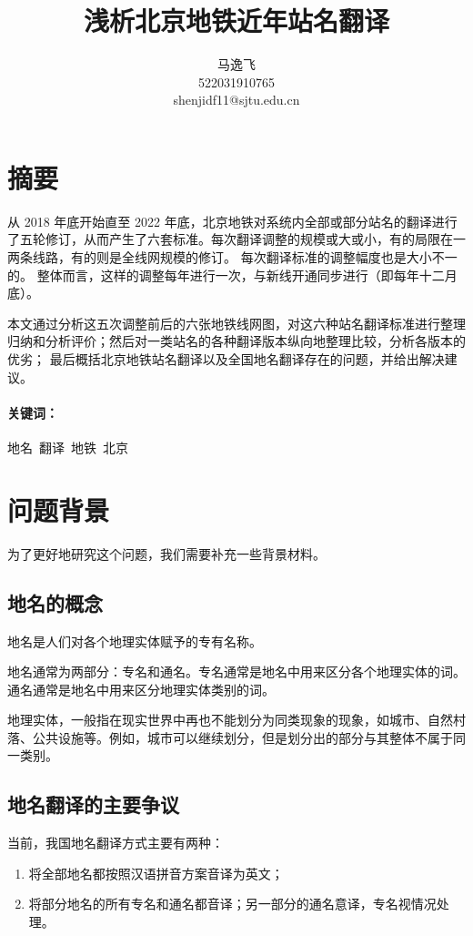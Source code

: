 \documentclass[a4paper,UTF8,12pt]{ctexart}
\title{浅析北京地铁近年站名翻译}
\author{马逸飞\\522031910765\\shenjidf11@sjtu.edu.cn}
\begin{document}
    \maketitle
    \tableofcontents

\section{摘要}
    从 2018 年底开始直至 2022 年底，北京地铁对系统内全部或部分站名的翻译进行了五轮修订，从而产生了六套标准。每次翻译调整的规模或大或小，有的局限在一两条线路，有的则是全线网规模的修订。
    每次翻译标准的调整幅度也是大小不一的。
    整体而言，这样的调整每年进行一次，与新线开通同步进行（即每年十二月底）。

    本文通过分析这五次调整前后的六张地铁线网图，对这六种站名翻译标准进行整理归纳和分析评价；然后对一类站名的各种翻译版本纵向地整理比较，分析各版本的优劣；
    最后概括北京地铁站名翻译以及全国地名翻译存在的问题，并给出解决建议。
    
    \paragraph{关键词：} 地名\ 翻译\ 地铁\ 北京

\section{问题背景}
    为了更好地研究这个问题，我们需要补充一些背景材料。

    \subsection{地名的概念}
        地名是人们对各个地理实体赋予的专有名称。\cite{ref1}

        地名通常为两部分：专名和通名。专名通常是地名中用来区分各个地理实体的词。通名通常是地名中用来区分地理实体类别的词。\cite{ref1}
	    
        地理实体，一般指在现实世界中再也不能划分为同类现象的现象，如城市、自然村落、公共设施等。例如，城市可以继续划分，但是划分出的部分与其整体不属于同一类别。
    \subsection{地名翻译的主要争议}
        当前，我国地名翻译方式主要有两种：
        \begin{enumerate}
            \item 将全部地名都按照汉语拼音方案音译为英文；
            \item 将部分地名的所有专名和通名都音译；另一部分的通名意译，专名视情况处理。
        \end{enumerate}
\end{document}
